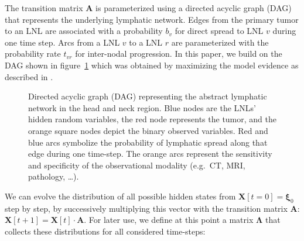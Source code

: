 \documentclass[
  sn-mathphys-num,
]{sn-jnl}
\begin{document}
The transition matrix \(\mathbf{A}\) is parameterized using a directed
acyclic graph (DAG) that represents the underlying lymphatic network.
Edges from the primary tumor to an LNL are associated with a probability
\(b_v\) for direct spread to LNL \(v\) during one time step. Arcs from a
LNL \(v\) to a LNL \(r\) are parameterized with the probability rate
\(t_{vr}\) for inter-nodal progression. In this paper, we build on the
DAG shown in figure~\ref{fig-full-graph} which was obtained by
maximizing the model evidence as described in
\citep{ludwig_modelling_2024}.

\begin{figure}


\caption{\label{fig-full-graph}Directed acyclic graph (DAG) representing
the abstract lymphatic network in the head and neck region. Blue nodes
are the LNLs' hidden random variables, the red node represents the
tumor, and the orange square nodes depict the binary observed variables.
Red and blue arcs symbolize the probability of lymphatic spread along
that edge during one time-step. The orange arcs represent the
sensitivity and specificity of the observational modality (e.g.~CT, MRI,
pathology, \ldots).}

\end{figure}%

We can evolve the distribution of all possible hidden states from
\(\mathbf{X}[t=0] = \boldsymbol{\xi}_0\) step by step, by successively
multiplying this vector with the transition matrix \(\mathbf{A}\):
\(\mathbf{X}[t+1] = \mathbf{X}[t] \cdot \mathbf{A}\). For later use, we
define at this point a matrix \(\boldsymbol{\Lambda}\) that collects
these distributions for all considered time-steps:
\end{document}

